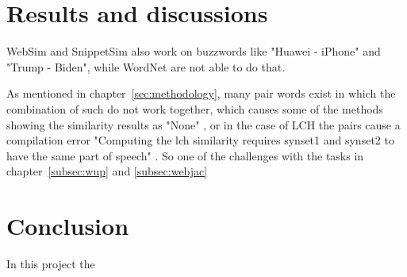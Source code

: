 \documentclass[conference]{IEEEtran}
\begin{document}
\section{Results and discussions}\label{sec:results}

WebSim and SnippetSim also work on buzzwords like "Huawei - iPhone" and "Trump - Biden", while WordNet are not able to do that.

As mentioned in chapter~\ref{sec:methodology}, many pair words exist in which the combination of such do not work together, which causes some of the methods showing the similarity results as "None" \cite{perkins}, or in the case of LCH the pairs cause a compilation error "Computing the lch similarity requires synset1 and synset2 to have the same part of speech" \cite{wordnet}. So one of the challenges with the tasks in chapter~\ref{subsec:wup} and \ref{subsec:webjac}


\section{Conclusion}\label{sec:conclusion}

In this project the 



 

\end{document}
